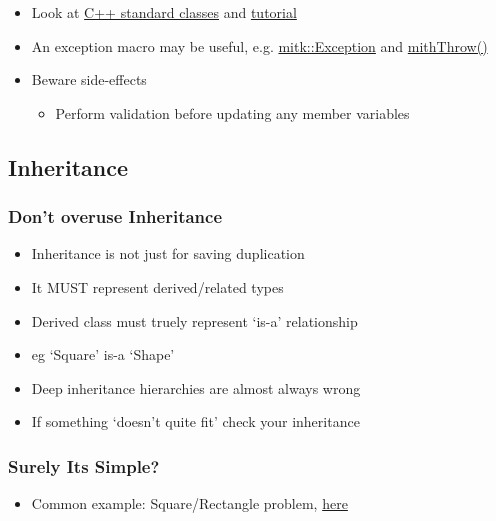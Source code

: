 \begin{itemize}
\itemsep1pt\parskip0pt
\item
  Look at \href{http://www.cplusplus.com/reference/exception/}{C++
  standard classes} and
  \href{http://www.cplusplus.com/doc/tutorial/exceptions/}{tutorial}
\item
  An exception macro may be useful, e.g.
  \href{https://github.com/MITK/MITK/blob/master/Modules/Core/include/mitkException.h}{mitk::Exception}
  and
  \href{https://github.com/MITK/MITK/blob/master/Modules/Core/include/mitkExceptionMacro.h}{mithThrow()}
\item
  Beware side-effects

  \begin{itemize}
  \itemsep1pt\parskip0pt
  \item
    Perform validation before updating any member variables
  \end{itemize}
\end{itemize}

\subsection{Inheritance}\label{inheritance-1}

\subsubsection{Don't overuse
Inheritance}\label{dont-overuse-inheritance}

\begin{itemize}
\itemsep1pt\parskip0pt
\item
  Inheritance is not just for saving duplication
\item
  It MUST represent derived/related types
\item
  Derived class must truely represent `is-a' relationship
\item
  eg `Square' is-a `Shape'
\item
  Deep inheritance hierarchies are almost always wrong
\item
  If something `doesn't quite fit' check your inheritance
\end{itemize}

\subsubsection{Surely Its Simple?}\label{surely-its-simple}

\begin{itemize}
\itemsep1pt\parskip0pt
\item
  Common example: Square/Rectangle problem,
  \href{http://www.oodesign.com/liskov-s-substitution-principle.html}{here}
\end{itemize}

